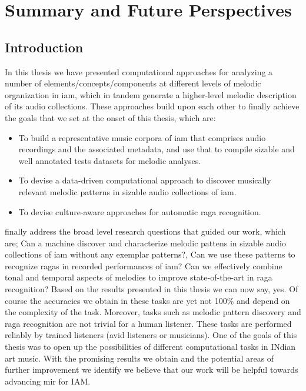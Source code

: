 
\chapter{Summary and Future Perspectives}
\label{sec:summary_future_work}

\section{Introduction}
\label{sec:summary_thesis}

In this thesis we have presented computational approaches for analyzing a number of elements/concepts/components at different levels of melodic organization in \gls{iam}, which in tandem generate a higher-level melodic description of its audio collections. These approaches build upon each other to finally achieve the goals that we set at the onset of this thesis, which are: 

\begin{itemize}
	\item To build a representative music corpora of \gls{iam} that comprises audio recordings and the associated metadata, and use that to compile sizable and well annotated tests datasets for melodic analyses.
	\item To devise a data-driven computational approach to discover musically relevant melodic patterns in sizable audio collections of \gls{iam}.
	\item To devise culture-aware approaches for automatic \gls{raga} recognition.
\end{itemize}

finally address the broad level research questions that guided our work, which are; Can a machine discover and characterize melodic pattens in sizable audio collections of \gls{iam} without any exemplar patterns?, Can we use these patterns to recognize \glspl{raga} in recorded performances of \gls{iam}?  Can we effectively combine tonal and temporal aspects of melodies to improve state-of-the-art in \gls{raga} recognition? Based on the results presented in this thesis we can now say, yes. Of course the accuracies we obtain in these tasks are yet not 100\% and depend on the complexity of the task. Moreover, tasks such as melodic pattern discovery and raga recognition are not trivial for a human listener. These tasks are performed reliably by trained listeners (avid listeners or musicians). One of the goals of this thesis was to open up the possibilities of different computational tasks in INdian art music. With the promising results we obtain and the potential areas of further improvement we identify we believe that our work will be helpful towards advancing mir for IAM. 


